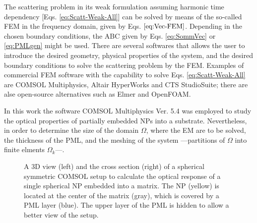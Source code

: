 
The scattering problem in its weak formulation assuming harmonic time dependency [Eqs. \eqref{eq:Scatt-Weak-All}] can be solved by means of the so-called FEM in the frequency domain, given by Eqs. $\eqref{eq:Vec-FEM}$. Depending in the chosen boundary conditions, the ABC given by Eqs. \eqref{eq:SommVec} or \eqref{eq:PMLgen} might be used. There are several softwares that allows the user to introduce the desired geometry, physical properties of the system, and the desired boundary conditions to solve the scattering problem by the FEM. Examples of commercial FEM software with the capability to solve Eqs. \eqref{eq:Scatt-Weak-All} are COMSOL Multiphysics, Altair HyperWorks and CTS StudioSuite; there are alse open-source alternatives such as Elmer and OpenFOAM.

In this work the software COMSOL Multiphysics Ver. 5.4 was employed to study the optical properties of partially embedded NPs into a substrate. Nevertheless, in order to determine the size of the domain $\Omega$, where the EM are to be solved, the thickness of the PML, and the meshing of the system ---partitions of $\Omega$ into finite elments $\Omega_k$---.



\begin{figure}
	\centering
	\def\svgwidth{.8\textwidth} \small
{}
\vspace*{0em}
\caption[Spherical symmetric COMSOL Setup]{A 3D view (left) and the cross section (right) of a spherical symmetric COMSOL setup to calculate the optical response of a single spherical NP embedded into a matrix. The NP (yellow) is located at the center of the matrix (gray), which is covered by a PML layer (blue). The upper layer of the PML is hidden to allow a better view of the setup.}
\label{fig:setup:sphere}
\end{figure}





